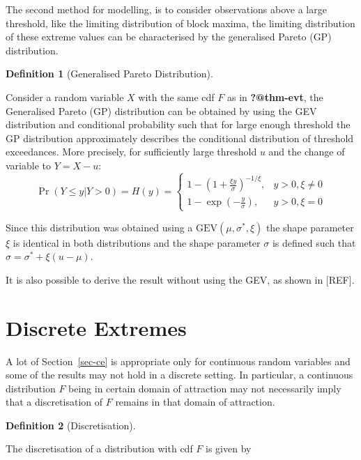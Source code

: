 \documentclass[
  10pt,
  a4paper,
]{scrreprt}
\theoremstyle{plain}
\theoremstyle{definition}
\newtheorem{definition}{Definition}[section]
\theoremstyle{plain}
\theoremstyle{remark}
\begin{document}
{The second method for modelling, is to consider observations above a
large threshold, like the limiting distribution of block maxima, the
limiting distribution of these extreme values can be characterised by
the generalised Pareto (GP) distribution.

\begin{definition}[Generalised Pareto
Distribution]\protect\hypertarget{def-gp}{}\label{def-gp}

Consider a random variable \(X\) with the same cdf \(F\) as in
\textbf{?@thm-evt}, the Generalised Pareto (GP) distribution can be
obtained by using the GEV distribution and conditional probability such
that for large enough threshold the GP distribution approximately
describes the conditional distribution of threshold exceedances. More
precisely, for sufficiently large threshold \(u\) and the change of
variable to \(Y=X-u\): \[
\Pr(Y\le y | Y>0) = H(y) = \begin{cases}
1-\left(1+\displaystyle\frac{\xi y}{\sigma}\right)^{-1/\xi},&y>0,\xi\ne 0 \\
1-\exp\left(-\displaystyle\frac{y}{\sigma}\right),&y>0,\xi = 0
\end{cases}
\]

\end{definition}

Since this distribution was obtained using a
\(\text{GEV}(\mu,\sigma^*,\xi)\) the shape parameter \(\xi\) is
identical in both distributions and the shape parameter \(\sigma\) is
defined such that \(\sigma = \sigma^* + \xi(u-\mu)\).

It is also possible to derive the result without using the GEV, as shown
in {[}REF{]}.

\hypertarget{sec-disc}{%
\section{Discrete Extremes}\label{sec-disc}}

A lot of Section~\ref{sec-ce} is appropriate only for continuous random
variables and some of the results may not hold in a discrete setting. In
particular, a continuous distribution \(F\) being in certain domain of
attraction may not necessarily imply that a discretisation of \(F\)
remains in that domain of attraction.

\begin{definition}[Discretisation]\protect\hypertarget{def-disc}{}\label{def-disc}

The discretisation of a distribution with cdf \(F\) is given by


\end{definition}}
\end{document}
